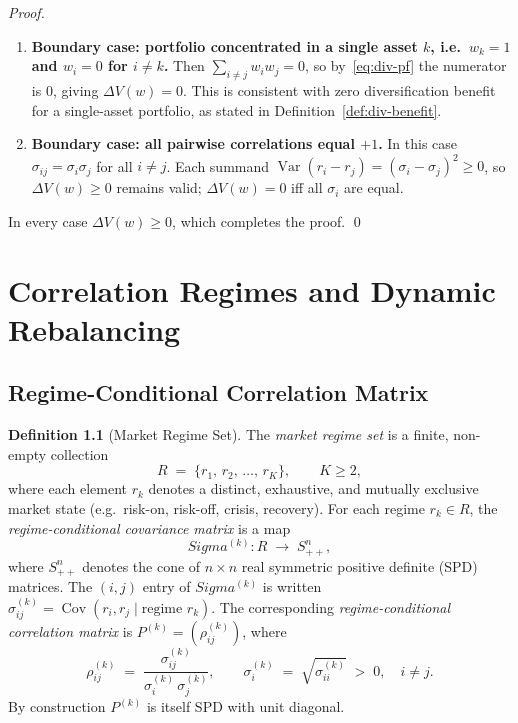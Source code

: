 \documentclass[12pt,openany]{book}
\newcommand{\bfw}{\mathbf{w}}
\newcommand{\bfSigma}{\boldsymbol{\Sigma}}
\DeclareMathOperator{\Var}{Var}
\DeclareMathOperator{\Cov}{Cov}
\numberwithin{equation}{chapter}
\theoremstyle{plain}
\theoremstyle{definition}
\newtheorem{definition}[theorem]{Definition}
\theoremstyle{remark}
\def\mathcal#1{#1}%
\def\bfw{w}%
\def\bfSigma{Sigma}%
\begin{document}
\begin{proof}
\begin{enumerate}[label=(\alph*)]
  \item \textbf{Boundary case: portfolio concentrated in a single
        asset $k$, i.e.\ $w_k = 1$ and $w_i = 0$ for $i \neq k$.}\;
        Then $\sum_{i \neq j} w_i w_j = 0$, so by~\eqref{eq:div-pf}
        the numerator is $0$, giving $\Delta V(\bfw) = 0$.
        This is consistent with zero diversification benefit for
        a single-asset portfolio, as stated in
        Definition~\ref{def:div-benefit}.

  \item \textbf{Boundary case: all pairwise correlations equal $+1$.}\;
        In this case $\sigma_{ij} = \sigma_i \sigma_j$ for all
        $i \neq j$.  Each summand $\Var(r_i - r_j)
        = (\sigma_i - \sigma_j)^2 \geq 0$, so $\Delta V(\bfw) \geq 0$
        remains valid; $\Delta V(\bfw) = 0$ iff all $\sigma_i$ are equal.
\end{enumerate}

\noindent In every case $\Delta V(\bfw) \geq 0$, which completes the
proof.
\qed
\end{proof}


\chapter{Correlation Regimes and Dynamic Rebalancing}
\label{ch:regime}

\section{Regime-Conditional Correlation Matrix}

\begin{definition}[Market Regime Set]
\label{def:regime-set}
The \emph{market regime set} is a finite, non-empty collection
\[
  \mathcal{R} \;=\; \{r_1,\, r_2,\, \ldots,\, r_K\}, \qquad K \geq 2,
\]
where each element $r_k$ denotes a distinct, exhaustive, and mutually
exclusive market state (e.g.\ risk-on, risk-off, crisis, recovery).
For each regime $r_k \in \mathcal{R}$, the \emph{regime-conditional
covariance matrix} is a map
\[
  \bfSigma^{(k)} : \mathcal{R} \;\longrightarrow\; \mathcal{S}_{++}^{n},
\]
where $\mathcal{S}_{++}^{n}$ denotes the cone of $n \times n$ real symmetric
positive definite (SPD) matrices.  The $(i,j)$ entry of
$\bfSigma^{(k)}$ is written $\sigma_{ij}^{(k)} = \Cov(r_i, r_j \mid
\text{regime } r_k)$.  The corresponding \emph{regime-conditional
correlation matrix} is $P^{(k)} = (\rho_{ij}^{(k)})$, where
\[
  \rho_{ij}^{(k)}
  \;=\; \frac{\sigma_{ij}^{(k)}}{\sigma_i^{(k)}\,\sigma_j^{(k)}},
  \qquad
  \sigma_i^{(k)} \;=\; \sqrt{\sigma_{ii}^{(k)}} \;>\; 0,
  \quad i \neq j.
\]
By construction $P^{(k)}$ is itself SPD with unit diagonal.
\end{definition}
\end{document}
